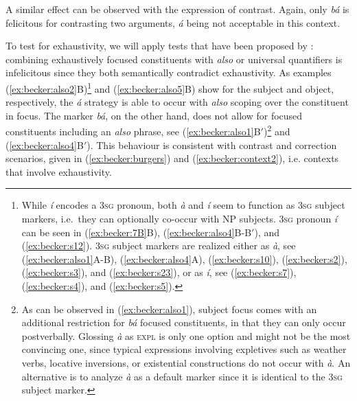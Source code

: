 \documentclass[output=paper,
modfonts
]{langscibook}
\begin{document}
A similar effect can be observed with the expression of contrast. Again, only \textit{bá} is felicitous for contrasting two arguments, \textit{á} being not acceptable in this context.

\ea \label{ex:becker:burgers}
\z\z
To test for exhaustivity, we will apply tests that have been proposed by  \citet{Kiss1998}: combining exhaustively focused constituents with \textit{also} or universal quantifiers is infelicitous since they both semantically contradict exhaustivity. 
As examples (\ref{ex:becker:also2}B)\footnote{While {\em \'i} encodes a \textsc{3sg} pronoun, both {\em \`a} and {\em \'i} seem to function as \textsc{3sg} subject markers, i.e.\ they can optionally co-occur with NP subjects. \textsc{3sg} pronoun {\em \'i} can be seen in (\ref{ex:becker:7B}B), (\ref{ex:becker:also4}B-B$'$), and (\ref{ex:becker:s12}). \textsc{3sg} subject markers are realized either as {\em \`a}, see (\ref{ex:becker:also1}A-B), (\ref{ex:becker:also4}A), (\ref{ex:becker:s10}), (\ref{ex:becker:s2}), (\ref{ex:becker:s3}), and (\ref{ex:becker:s23}), or as {\em \'i}, see (\ref{ex:becker:s7}), (\ref{ex:becker:s4}), and (\ref{ex:becker:s5}).} and  (\ref{ex:becker:also5}B) show for the subject and object,  respectively, the {\em \'a} strategy is able to occur with {\em also} scoping over the constituent in focus. The marker \textit{bá}, on the other hand, does not allow for focused constituents including an \textit{also} phrase, see (\ref{ex:becker:also1}B$'$)\footnote{As can be observed in (\ref{ex:becker:also1}), subject focus comes with an additional restriction for {\em b\'a} focused constituents, in that they can only occur postverbally. Glossing {\em \`a} as \textsc{expl} is only one option and might not be the most convincing one, since typical expressions involving expletives such as weather verbs, locative inversions, or existential constructions do not occur with {\em \`a}. An alternative is to analyze {\em \`a} as a default marker since it is identical to the \textsc{3sg} subject marker.} and (\ref{ex:becker:also4}B$'$). This behaviour is consistent with contrast and correction scenarios, given in (\ref{ex:becker:burgers}) and (\ref{ex:becker:context2}), i.e. contexts that involve exhaustivity.
\end{document}

